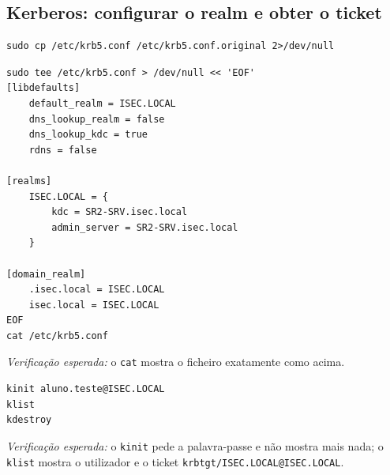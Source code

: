 
\subsection[Kerberos: configurar o realm e obter o ticket]{Kerberos: configurar o realm e obter o ticket}


\begin{lstlisting}[style=bashstyle]
sudo cp /etc/krb5.conf /etc/krb5.conf.original 2>/dev/null
\end{lstlisting}


\begin{lstlisting}[style=bashstyle]
sudo tee /etc/krb5.conf > /dev/null << 'EOF'
[libdefaults]
    default_realm = ISEC.LOCAL
    dns_lookup_realm = false
    dns_lookup_kdc = true
    rdns = false

[realms]
    ISEC.LOCAL = {
        kdc = SR2-SRV.isec.local
        admin_server = SR2-SRV.isec.local
    }

[domain_realm]
    .isec.local = ISEC.LOCAL
    isec.local = ISEC.LOCAL
EOF
cat /etc/krb5.conf
\end{lstlisting}

\emph{Verificação esperada:} o \texttt{cat} mostra o ficheiro exatamente como acima.


\begin{lstlisting}[style=bashstyle]
kinit aluno.teste@ISEC.LOCAL
klist
kdestroy
\end{lstlisting}

\emph{Verificação esperada:} o \texttt{kinit} pede a palavra-passe e não mostra mais nada; o \texttt{klist} mostra o utilizador e o ticket \texttt{krbtgt/\allowbreak{}ISEC.LOCAL@ISEC.LOCAL}.

